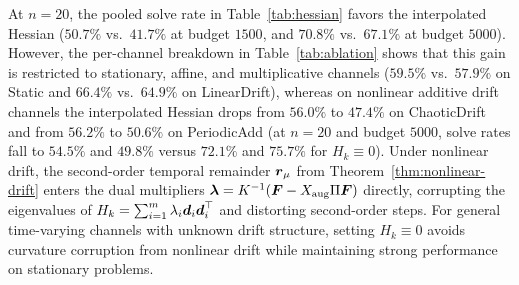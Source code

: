 At $n = 20$, the pooled solve rate in Table~\ref{tab:hessian} favors the interpolated Hessian ($50.7\%$ vs.\ $41.7\%$ at budget $1500$, and $70.8\%$ vs.\ $67.1\%$ at budget $5000$). However, the per-channel breakdown in Table~\ref{tab:ablation} shows that this gain is restricted to stationary, affine, and multiplicative channels ($59.5\%$ vs.\ $57.9\%$ on Static and $66.4\%$ vs.\ $64.9\%$ on LinearDrift), whereas on nonlinear additive drift channels the interpolated Hessian drops from $56.0\%$ to $47.4\%$ on ChaoticDrift and from $56.2\%$ to $50.6\%$ on PeriodicAdd (at $n=20$ and budget $5000$, solve rates fall to $54.5\%$ and $49.8\%$ versus $72.1\%$ and $75.7\%$ for $H_k \equiv 0$). Under nonlinear drift, the second-order temporal remainder $\boldsymbol{r}_\mu$ from Theorem~\ref{thm:nonlinear-drift} enters the dual multipliers $\boldsymbol{\lambda} = K^{-1}(\boldsymbol{F} - X_{\mathrm{aug}}\Pi\boldsymbol{F})$ directly, corrupting the eigenvalues of $H_k = \sum_{i=1}^m \lambda_i \boldsymbol{d}_i \boldsymbol{d}_i^\top$ and distorting second-order steps. For general time-varying channels with unknown drift structure, setting $H_k \equiv 0$ avoids curvature corruption from nonlinear drift while maintaining strong performance on stationary problems.

